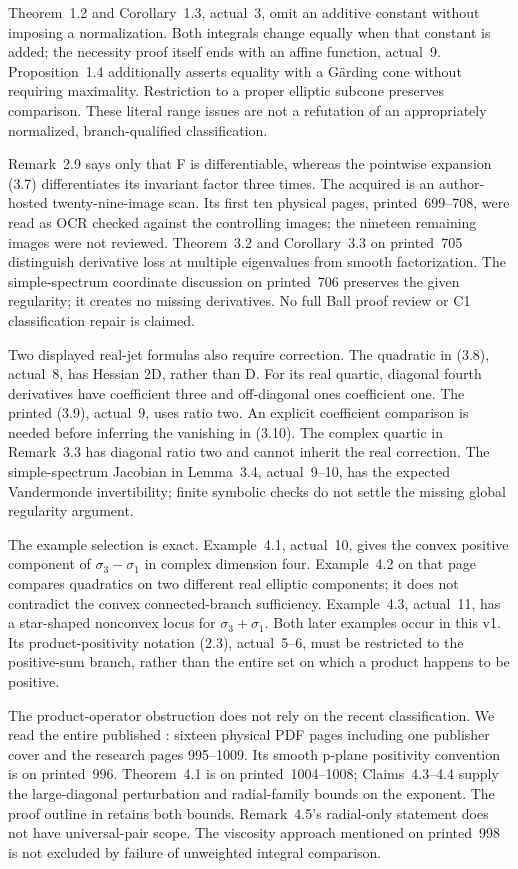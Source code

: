 Theorem~1.2 and Corollary~1.3, actual~3, omit an additive
constant without imposing a normalization. Both integrals
change equally when that constant is added; the necessity
proof itself ends with an affine function, actual~9.
Proposition~1.4 additionally asserts equality with a G\"arding
cone without requiring maximality. Restriction to a proper
elliptic subcone preserves comparison. These literal range
issues are not a refutation of an appropriately normalized,
branch-qualified classification.

Remark~2.9 says only that F is differentiable, whereas the
pointwise expansion (3.7) differentiates its invariant
factor three times. The acquired
\cite{Ball84SymmetricPublished} is an author-hosted twenty-nine-image
scan. Its first ten physical pages, printed~699--708, were
read as OCR checked against the controlling images; the
nineteen remaining images were not reviewed. Theorem~3.2
and Corollary~3.3 on printed~705 distinguish derivative loss
at multiple eigenvalues from smooth factorization. The
simple-spectrum coordinate discussion on printed~706
preserves the given regularity; it creates no missing derivatives.
No full Ball proof review or C1 classification repair is claimed.

Two displayed real-jet formulas also require correction.
The quadratic in (3.8), actual~8, has Hessian 2D, rather
than D. For its real quartic, diagonal fourth derivatives
have coefficient three and off-diagonal ones coefficient
one. The printed (3.9), actual~9, uses ratio two. An
explicit coefficient comparison is needed before inferring
the vanishing in (3.10). The complex quartic in Remark~3.3
has diagonal ratio two and cannot inherit the real correction.
The simple-spectrum Jacobian in Lemma~3.4, actual~9--10,
has the expected Vandermonde invertibility; finite symbolic
checks do not settle the missing global regularity argument.

The example selection is exact. Example~4.1, actual~10,
gives the convex positive component of
\(\sigma_3-\sigma_1\) in complex dimension four.
Example~4.2 on that page compares quadratics on two
different real elliptic components; it does not contradict
the convex connected-branch sufficiency. Example~4.3,
actual~11, has a star-shaped nonconvex locus for
\(\sigma_3+\sigma_1\). Both later examples occur in this v1.
Its product-positivity notation (2.3), actual~5--6, must be
restricted to the positive-sum branch, rather than the
entire set on which a product happens to be positive.

The product-operator obstruction does not rely on the
recent classification. We read the entire published
\cite{Dinew22SadullaevPublished}: sixteen physical PDF
pages including one publisher cover and the research pages
995--1009. Its smooth p-plane positivity convention is
on printed~996. Theorem~4.1 is on printed~1004--1008;
Claims~4.3--4.4 supply the large-diagonal perturbation
and radial-family bounds on the exponent. The proof
outline in 
retains both bounds. Remark~4.5's radial-only statement
does not have universal-pair scope. The viscosity approach
mentioned on printed~998 is not excluded by failure of
unweighted integral comparison.

